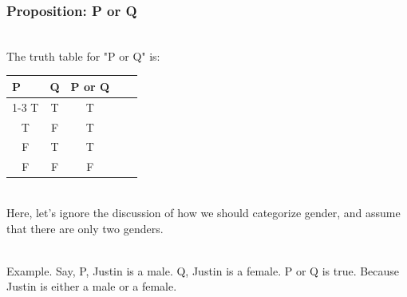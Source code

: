 \documentclass{beamer}
\numberwithin{equation}{section}
\begin{document}
\begin{frame}
\frametitle{Proposition: P or Q}

\ \\The truth table for "P or Q" is:

\begin{table}[]
\begin{tabular}{cccll}
\multicolumn{1}{l}{P} & \multicolumn{1}{l}{Q} & \multicolumn{1}{l}{P or Q} &  &  \\ \cline{1-3}
T                     & T                     & T                          &  &  \\
T                     & F                     & T                          &  &  \\
F                     & T                     & T                          &  &  \\
F                     & F                     & F                          &  & 
\end{tabular}
\end{table} \pause

\ \\ Here, let's ignore the discussion of how we should categorize gender, and assume that there are only two genders. \pause

\ \\Example. Say, P, Justin is a male. Q, Justin is a female. P or Q is true. Because Justin is either a male or a female.

\end{frame}
\end{document}
